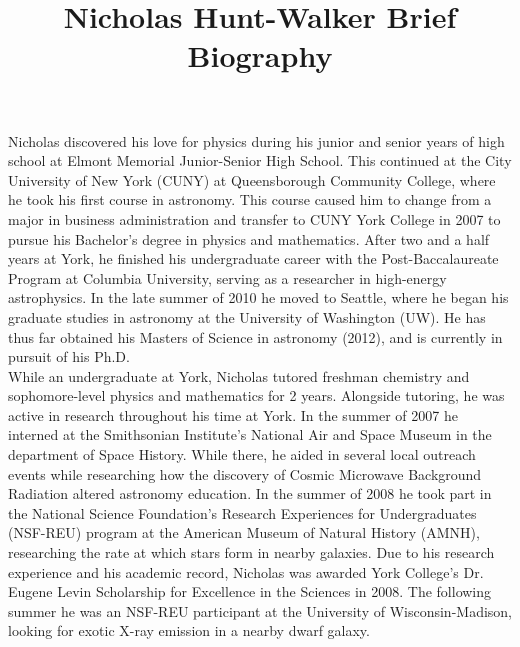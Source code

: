 \documentclass[12pt]{article}
\begin{document}
\title{Nicholas Hunt-Walker Brief Biography}
\date{}
\maketitle

\vspace{-0.5in}
Nicholas discovered his love for physics during his junior and senior years of high school at Elmont Memorial Junior-Senior High School. This continued at the City University of New York (CUNY) at Queensborough Community College, where he took his first course in astronomy. This course caused him to change from a major in business administration and transfer to CUNY York College in 2007 to pursue his Bachelor's degree in physics and mathematics. After two and a half years at York, he finished his undergraduate career with the Post-Baccalaureate Program at Columbia University, serving as a researcher in high-energy astrophysics.  In the late summer of 2010 he moved to Seattle, where he began his graduate studies in astronomy at the University of Washington (UW). He has thus far obtained his Masters of Science in astronomy (2012), and is currently in pursuit of his Ph.D.\\

While an undergraduate at York, Nicholas tutored freshman chemistry and sophomore-level physics and mathematics for 2 years. Alongside tutoring, he was active in research throughout his time at York. In the summer of 2007 he interned at the Smithsonian Institute's National Air and Space Museum in the department of Space History. While there, he aided in several local outreach events while researching how the discovery of Cosmic Microwave Background Radiation altered astronomy education. In the summer of 2008 he took part in the National Science Foundation's Research Experiences for Undergraduates (NSF-REU) program at the American Museum of Natural History (AMNH), researching the rate at which stars form in nearby galaxies. Due to his research experience and his academic record, Nicholas was awarded York College's Dr. Eugene Levin Scholarship for Excellence in the Sciences in 2008. The following summer he was an NSF-REU participant at the University of Wisconsin-Madison, looking for exotic X-ray emission in a nearby dwarf galaxy.\\
\end{document}
